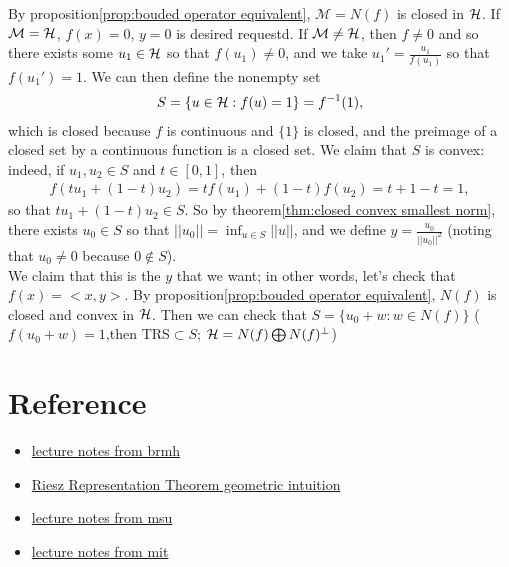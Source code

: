 \begin{proofsolution}
    By proposition\ref{prop:bouded operator equivalent}, $\mathcal{M} = N(f)$ is closed in $\mathcal{H}$. If $\mathcal{M}=\mathcal{H}$, $f(x)=0$, $y=0$ is desired requestd.
    If $\mathcal{M}\neq \mathcal{H}$, then $f\neq 0$ and so  there exists some $u_1\in\mathcal{H}$ so that $f(u_1)\neq 0$, and we take $u_1'=\frac{u_1}{f(u_1)}$ so that $f(u_1')=1$. We can then define the nonempty set
    \begin{align*}
        S = \{u\in\mathcal{H}:f(u)=1\}=f^{-1}({1}),
    \end{align*}
    which is closed because $f$ is continuous and $\{1\}$ is closed, and the preimage of a closed set by a continuous function is a closed set. We claim that $S$ is convex: indeed, if $u_1,u_2\in S$ and $t\in [0,1]$, then
    \begin{align*}
        f(tu_1+(1-t)u_2) = tf(u_1)+(1-t)f(u_2) = t+1-t=1,
    \end{align*}
    so that $tu_1+(1-t)u_2\in S$. So by theorem\ref{thm:closed convex smallest norm}, there exists $u_0\in S$ so that $||u_0|| = \inf_{u\in S}||u||$, and
    we define $y=\frac{u_0}{||u_0||^2}$ (noting that $u_0\neq 0$ because $0\notin S$).\\ 
    We claim  that this is the $y$ that we want; in other words, let's check that $f(x) = <x, y>$.
    By proposition\ref{prop:bouded operator equivalent}, $N(f)$ is closed and convex in $\mathcal{H}$. Then we can check that $S=\{u_0+w:w\in N(f)\}$ ($f(u_0+w)=1$,then TRS$\subset S$; $\mathcal{H}=N(f)\bigoplus N(f)^{\perp}$)
\end{proofsolution}

\section{Reference}
\begin{itemize}
    \item \href{https://web.mat.bham.ac.uk/~malevao/MSM3P21/l15.pdf}{lecture notes from brmh}
    \item \href{https://math.stackexchange.com/questions/3699482/riesz-representation-theorem-geometric-intuition}{Riesz Representation Theorem geometric intuition}
    \item \href{https://users.math.msu.edu/users/banelson/teaching/920/chI_notes.pdf}{lecture notes from msu}
    \item \href{https://ocw.mit.edu/courses/18-102-introduction-to-functional-analysis-spring-2021/resources/mit18_102s21_lec17/}{lecture notes from mit}
\end{itemize}